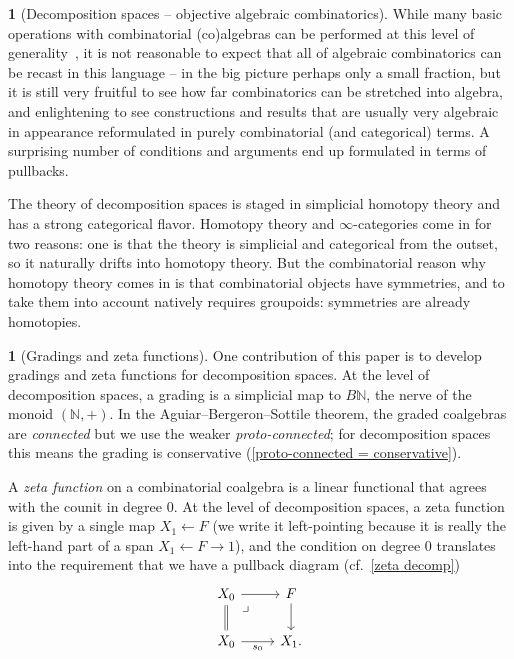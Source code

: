 \documentclass{amsart}
\newcommand{\N}{\mathbb{N}}
\newcommand{\drpullback}{\arrow[phantom]{dr}[very near start,description]{\lrcorner}}
\theoremstyle{definition}
\theoremstyle{noname}
\newtheorem{blanko}[theorem]{}
\begin{document}
\begin{blanko}[Decomposition spaces -- objective algebraic combinatorics]
  While many basic operations with   combinatorial
  (co)algebras can be performed at this level of
  generality~\cite{Galvez-Kock-Tonks:1612.09225}, it is not reasonable to expect
  that all of algebraic combinatorics can be recast in this 
  language -- in the big picture perhaps only a small fraction,
  but it is
  still very fruitful to see how far combinatorics can be stretched into 
  algebra, and enlightening to see constructions and results that are usually
  very algebraic in appearance reformulated in purely combinatorial (and 
  categorical) terms. A surprising number of conditions and arguments end up
  formulated in terms of pullbacks.

  The theory of decomposition spaces is staged in simplicial homotopy theory and has a
  strong categorical flavor. Homotopy theory and $\infty$-categories come in for two
  reasons: one is that the theory is simplicial and categorical from the outset, so it
  naturally drifts into homotopy theory. But the combinatorial reason why homotopy
  theory comes in is that combinatorial objects have symmetries, and to take them into
  account natively requires groupoids: symmetries are already homotopies.
    
\end{blanko}




\begin{blanko}[Gradings and zeta functions]
One contribution of this paper is to develop gradings and zeta functions for decomposition spaces.
  At the level of decomposition spaces, a grading is a simplicial map to
  $B\N$, the nerve of the monoid $(\N,+)$. In the Aguiar--Bergeron--Sottile
  theorem, the graded coalgebras are \emph{connected} but we use the weaker
  \emph{proto-connected}; for decomposition spaces this means the grading is 
  conservative (\cref{proto-connected = conservative}).

  A {\em zeta function} on a combinatorial coalgebra is a linear
  functional that agrees with the counit in degree $0$. 
  At the level of decomposition spaces, a zeta function is
  given by a single map $X_1 \leftarrow F$ (we write it left-pointing 
  because it is really the left-hand part of a span $X_1 \leftarrow F \to 
  1$), and the condition on
  degree $0$ translates into the requirement that we have a
  pullback diagram (cf.\ \ref{zeta decomp})
  \begin{equation*}
  \begin{tikzcd}
  X_0 \ar[d, equal] \drpullback \ar[r] & F \ar[d]  \\
  X_0 \ar[r, "s_0"'] & X_1 .
  \end{tikzcd}
  \end{equation*}


\end{blanko}
\end{document}
